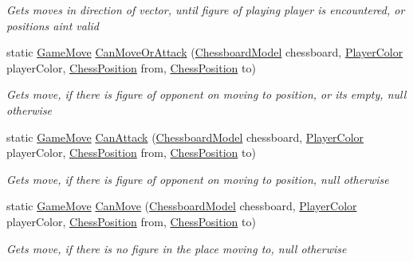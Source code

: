 \begin{DoxyCompactItemize}
\begin{DoxyCompactList}\small\item\em Gets moves in direction of vector, until figure of playing player is encountered, or positions ain\textquotesingle{}t valid \end{DoxyCompactList}\item 
static \mbox{\hyperlink{class_chess_tracking_1_1_game_1_1_game_move}{Game\+Move}} \mbox{\hyperlink{class_chess_tracking_1_1_game_1_1_game_validator_ac060c9914c0e4efeaaa5d9db4b282e2e}{Can\+Move\+Or\+Attack}} (\mbox{\hyperlink{class_chess_tracking_1_1_game_1_1_chessboard_model}{Chessboard\+Model}} chessboard, \mbox{\hyperlink{namespace_chess_tracking_1_1_game_ab79070a55977a8c8326e9cdda7dcfa9a}{Player\+Color}} player\+Color, \mbox{\hyperlink{class_chess_tracking_1_1_game_1_1_chess_position}{Chess\+Position}} from, \mbox{\hyperlink{class_chess_tracking_1_1_game_1_1_chess_position}{Chess\+Position}} to)
\begin{DoxyCompactList}\small\item\em Gets move, if there is figure of opponent on moving to position, or its empty, null otherwise \end{DoxyCompactList}\item 
static \mbox{\hyperlink{class_chess_tracking_1_1_game_1_1_game_move}{Game\+Move}} \mbox{\hyperlink{class_chess_tracking_1_1_game_1_1_game_validator_a2230b130e68b1827d1d85c06e6cd63d8}{Can\+Attack}} (\mbox{\hyperlink{class_chess_tracking_1_1_game_1_1_chessboard_model}{Chessboard\+Model}} chessboard, \mbox{\hyperlink{namespace_chess_tracking_1_1_game_ab79070a55977a8c8326e9cdda7dcfa9a}{Player\+Color}} player\+Color, \mbox{\hyperlink{class_chess_tracking_1_1_game_1_1_chess_position}{Chess\+Position}} from, \mbox{\hyperlink{class_chess_tracking_1_1_game_1_1_chess_position}{Chess\+Position}} to)
\begin{DoxyCompactList}\small\item\em Gets move, if there is figure of opponent on moving to position, null otherwise \end{DoxyCompactList}\item 
static \mbox{\hyperlink{class_chess_tracking_1_1_game_1_1_game_move}{Game\+Move}} \mbox{\hyperlink{class_chess_tracking_1_1_game_1_1_game_validator_ab292e53f0f73662f01c2bc44d12d43c1}{Can\+Move}} (\mbox{\hyperlink{class_chess_tracking_1_1_game_1_1_chessboard_model}{Chessboard\+Model}} chessboard, \mbox{\hyperlink{namespace_chess_tracking_1_1_game_ab79070a55977a8c8326e9cdda7dcfa9a}{Player\+Color}} player\+Color, \mbox{\hyperlink{class_chess_tracking_1_1_game_1_1_chess_position}{Chess\+Position}} from, \mbox{\hyperlink{class_chess_tracking_1_1_game_1_1_chess_position}{Chess\+Position}} to)
\begin{DoxyCompactList}\small\item\em Gets move, if there is no figure in the place moving to, null otherwise \end{DoxyCompactList}\end{DoxyCompactItemize}



